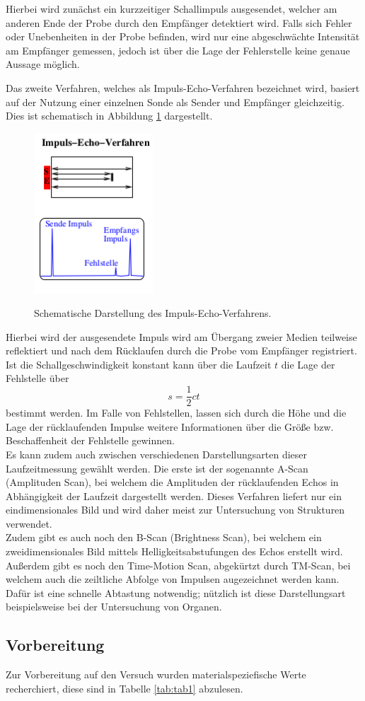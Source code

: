 Hierbei wird zunächst ein kurzzeitiger Schallimpuls ausgesendet, welcher am anderen Ende
der Probe durch den Empfänger detektiert wird. Falls sich Fehler oder Unebenheiten
in der Probe befinden, wird nur eine abgeschwächte Intensität am
Empfänger gemessen, jedoch ist über die Lage der Fehlerstelle keine genaue Aussage möglich.


Das zweite Verfahren, welches als Impuls-Echo-Verfahren bezeichnet wird,
basiert auf der Nutzung einer einzelnen Sonde als Sender und Empfänger gleichzeitig. Dies ist
schematisch in Abbildung \ref{fig:echo}
dargestellt.

\begin{figure}[H]
  \centering
  \includegraphics[height=6cm]{echo.png}
  \caption{Schematische Darstellung des  Impuls-Echo-Verfahrens.}
  \label{fig:echo}
  \cite{skript}
\end{figure}

Hierbei wird der ausgesendete Impuls wird am Übergang zweier Medien teilweise reflektiert und nach
dem Rücklaufen durch die Probe vom Empfänger registriert. Ist die Schallgeschwindigkeit
konstant kann über die Laufzeit $t$ die Lage der Fehlstelle über
\begin{equation}
  s=\frac{1}{2}ct
  \label{strecke}
\end{equation}
bestimmt werden.
Im Falle von Fehlstellen, lassen sich durch die Höhe und die Lage der rücklaufenden Impulse
weitere Informationen über die Größe bzw. Beschaffenheit der Fehlstelle gewinnen. \\
Es kann zudem auch zwischen verschiedenen Darstellungsarten dieser Laufzeitmessung
gewählt werden.
Die erste ist der sogenannte A-Scan (Amplituden Scan), bei welchem die Amplituden der rücklaufenden
Echos in Abhängigkeit der Laufzeit dargestellt werden. Dieses Verfahren liefert nur ein
eindimensionales Bild und wird daher meist zur Untersuchung von Strukturen verwendet.\\
Zudem gibt es auch noch den B-Scan (Brightness Scan), bei welchem ein zweidimensionales Bild mittels
Helligkeitsabstufungen des Echos erstellt wird. Außerdem gibt es noch den Time-Motion Scan,
abgekürtzt durch TM-Scan, bei welchem auch die zeiltliche Abfolge von Impulsen augezeichnet
werden kann. Dafür ist eine schnelle Abtastung notwendig; nützlich ist diese Darstellungsart
beispielsweise bei der Untersuchung von Organen.


\subsection{Vorbereitung}
Zur Vorbereitung auf den Versuch wurden materialspeziefische Werte recherchiert, diese
sind in Tabelle \ref{tab:tab1} abzulesen.


